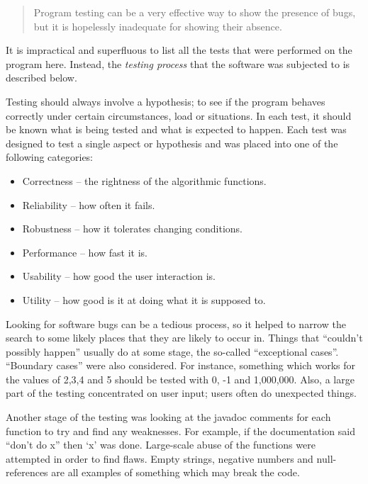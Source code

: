 \begin{quotation}

Program testing can be a very effective way to show the presence of bugs,
but it is hopelessly inadequate for showing their absence.\cite{dijkstra}

\end{quotation}

It is impractical and superfluous to list all the tests that were performed
on the program here. Instead, the \emph{testing process} that the software
was subjected to is described below.

Testing should always involve a hypothesis; to see if the program behaves
correctly under certain circumstances, load or situations. In each test, it
should be known what is being tested and what is expected to happen. Each
test was designed to test a single aspect or hypothesis and was placed into
one of the following categories:

\begin{itemize}

\item Correctness -- the rightness of the algorithmic functions.

\item Reliability -- how often it fails.

\item Robustness -- how it tolerates changing conditions.

\item Performance -- how fast it is.

\item Usability -- how good the user interaction is.

\item Utility -- how good is it at doing what it is supposed to.

\end{itemize}

Looking for software bugs can be a tedious process, so it helped to narrow the
search to some likely places that they are likely to occur in. Things that
``couldn't possibly happen'' usually do at some stage, the so-called
``exceptional cases''. ``Boundary cases'' were also considered. For instance,
something which works for the values of 2,3,4 and 5 should be tested with 0, -1
and 1,000,000. Also, a large part of the testing concentrated on user input;
users often do unexpected things.

Another stage of the testing was looking at the javadoc comments for each
function to try and find any weaknesses. For example, if the documentation said
``don't do x'' then `x' was done. Large-scale abuse of the functions were
attempted in order to find flaws. Empty strings, negative numbers and
null-references are all examples of something which may break the code.

